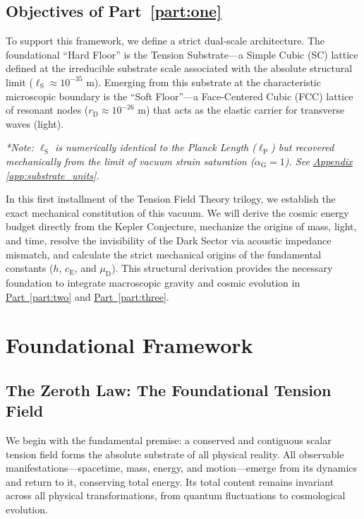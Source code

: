 \section{Objectives of Part~\ref{part:one}}
To support this framework, we define a strict dual-scale architecture. The foundational ``Hard Floor'' is the Tension Substrate---a Simple Cubic (SC) lattice defined at the irreducible substrate scale associated with the absolute structural limit ($\ell_{\mathrm{S}} \approx 10^{-35}$ m). Emerging from this substrate at the characteristic microscopic boundary is the “Soft Floor”---a Face-Centered Cubic (FCC) lattice of resonant nodes ($r_{\mathrm{D}} \approx 10^{-26}$ m) that acts as the elastic carrier for transverse waves (light). 

\textit{*Note: $\ell_{\mathrm{S}}$ is numerically identical to the Planck Length ($\ell_{\mathrm{P}}$) but recovered mechanically from the limit of vacuum strain saturation ($\alpha_{\mathrm{G}} = 1$). See \hyperref[app:substrate_units]{Appendix \ref*{app:substrate_units}}.}

In this first installment of the Tension Field Theory trilogy, we establish the exact mechanical constitution of this vacuum. We will derive the cosmic energy budget directly from the Kepler Conjecture, mechanize the origins of mass, light, and time, resolve the invisibility of the Dark Sector via acoustic impedance mismatch, and calculate the strict mechanical origins of the fundamental constants ($h$, $c_{\mathrm{E}}$, and $\mu_{\mathrm{D}}$). This structural derivation provides the necessary foundation to integrate macroscopic gravity and cosmic evolution in \hyperref[part:two]{Part~\ref{part:two}} and \hyperref[part:three]{Part~\ref{part:three}}.


\chapter{Foundational Framework}

\section{The Zeroth Law: The Foundational Tension Field}
\label{sec:zeroth_law}
We begin with the fundamental premise: a conserved and contiguous scalar tension field forms the absolute substrate of all physical reality. All observable manifestations---spacetime, mass, energy, and motion---emerge from its dynamics and return to it, conserving total energy. Its total content remains invariant across all physical transformations, from quantum fluctuations to cosmological evolution.

